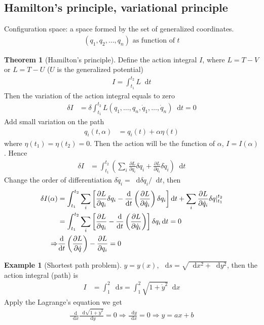 \documentclass[twoside,11pt]{article}
\numberwithin{equation}{section} %
\newcommand{\lms}{\fontfamily{lmss}\selectfont} %
\renewcommand*\d{\mathop{}\!\mathrm{d}}
\theoremstyle{definition}
\newtheorem{theorem}{\lms Theorem}[section]
\newtheorem{example}{\lms Example}[section]
\theoremstyle{remark}
\begin{document}
\subsection{Hamilton's principle, variational principle}
Configuration space: a space formed by the set of generalized coordinates.
\begin{align}
    (q_1, q_2, \dots, q_n)\text{ as function of $t$}
\end{align}
\begin{theorem}[Hamilton's principle]
Define the action integral $I$, where $L=T-V$ or $L=T-U$ ($U$ is the generalized
potential)
\begin{align}
    I =  \int_{t_1}^{t_2}L\d t
\end{align}
Then the variation of the action integral equals to zero
\begin{align}
    \delta I &= 
    \delta \int_{t_1}^{t_2}L(q_1,\dots, q_n,\dot{q}_1,\dots,\dot{q}_n)\d t
    = 0
\end{align}
Add small variation on the path
\begin{align}
    q_i(t, \alpha) &= q_i(t) + \alpha\eta(t)
\end{align}
where $\eta(t_1)=\eta(t_2)=0$.
Then the action will be the function of $\alpha$, $I=I(\alpha)$.
Hence
\begin{align}
    \delta I &= 
    \int_{t_1}^{t_2}\left(\sum_i \frac{\partial L}{\partial q_i}\delta q_i
    + \frac{\partial L}{\partial \dot{q}_i}\delta\dot{q}_i\right)\d t
\end{align}
Change the order of differentiation $\delta\dot{q}_i = \d \delta q_i/\d t$, then
\begin{align}
    \delta I(\alpha) &= 
    \int_{t_1}^{t_2}\sum_i\left[
        \frac{\partial L}{\partial q_i}\delta q_i
        - \frac{\d}{\d t}\left(\frac{\partial L}{\partial\dot{q}_i}\right)\delta q_i
        \right]\d t
        + \sum_i\frac{\partial L}{\partial\dot{q}_i}\delta q\large|_{t_1}^{t_2}\\
    &= 
    \int_{t_1}^{t_2}\sum_i\left[
        \frac{\partial L}{\partial q_i}
        - \frac{\d}{\d t}\left(\frac{\partial L}{\partial\dot{q}_i}\right)
    \right]\delta q_i\d t = 0 \\
    \Rightarrow
    & \frac{\d}{\d t}\left(\frac{\partial L}{\partial\dot{q}}\right)
    - \frac{\partial L}{\partial q_i} = 0
\end{align}
\end{theorem}

\begin{example}[Shortest path problem]
$y=y(x)$, $\d s = \sqrt{\d x^2 + \d y^2}$, then the action integral (path) is
\begin{align}
    I &= \int_1^2\d s = 
    \int_1^2\sqrt{1+\dot{y}^2}\d x
\end{align}
Apply the Lagrange's equation we get
\begin{align}
    \frac{\d }{\d x}\frac{\d \sqrt{1+\dot{y}^2}}{\d \dot{y}} = 0
    \Rightarrow \frac{\d\dot{y}}{\d x} = 0
    \Rightarrow y = ax + b
\end{align}
\end{example}
\end{document}
